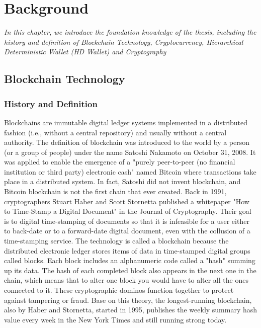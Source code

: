 \chapter{Background} \label{chap:Background}

\label{chap:background}
	\textit{In this chapter, we introduce the foundation knowledge of the thesis, including the history and definition of Blockchain Technology, Cryptocurrency, 
	Hierarchical Deterministic Wallet (HD Wallet) and Cryptography}
\minitoc

\section{Blockchain Technology}

\subsection{History and Definition}

Blockchains are immutable digital ledger systems implemented in a distributed fashion (i.e., without a central repository) and usually without a central authority.
The definition of blockchain was introduced to the world by a person (or a group of people) under the name Satoshi Nakamoto on October 31, 2008. 
It was applied to enable the emergence of a "purely peer-to-peer (no financial institution or third party) electronic cash" named Bitcoin where transactions take place in a distributed system.
In fact, Satoshi did not invent blockchain, and Bitcoin blockchain is not the first chain that ever created. 
Back in 1991, cryptographers Stuart Haber and Scott Stornetta published a whitepaper "How to Time-Stamp a Digital Document" in the Journal of Cryptography. 
Their goal is to digital time-stamping of documents so that it is infeasible for a user either to back-date or to a forward-date digital document, even with the collusion of a time-stamping service. 
The technology is called a blockchain because the distributed electronic ledger stores items of data in time-stamped digital groups called blocks. Each block includes an alphanumeric code called a "hash" summing up its data. The hash of each completed block also appears in the next one in the chain, which means that to alter one block you would have to alter all the ones connected to it. These cryptographic dominos function together to protect against tampering or fraud.
Base on this theory, the longest-running blockchain, also by Haber and Stornetta, started in 1995, publishes the weekly summary hash value every week in the New York Times and still running strong today. 

